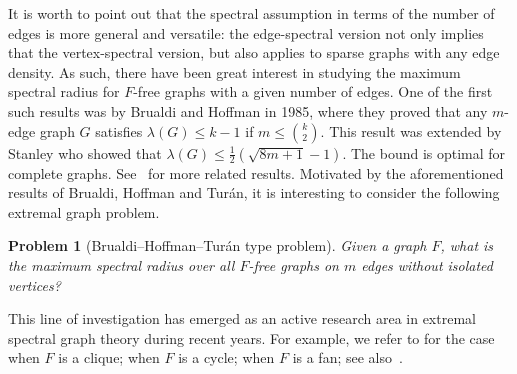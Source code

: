 \documentclass[11pt,a4paper]{article}
\newtheorem*{problem*}{Problem}
\theoremstyle{definition}
\theoremstyle{remark}
\newcommand{\spex}{\mathrm{spex}_{\mathrm{edge}}}
\begin{document}
It is worth to point out that the spectral assumption in terms of the number of edges is more general and versatile: the edge-spectral version not only implies that the vertex-spectral version, but also applies to sparse graphs with any edge density. As such, there have been great interest in studying the maximum spectral radius for $F$-free graphs with a given number of edges. One of the first such results was by Brualdi and Hoffman \cite{BH1985} in 1985, where they proved that any $m$-edge graph $G$ satisfies $\lambda (G)\le k-1$ if $m\le {k \choose 2}$. 
 This result was extended by Stanley \cite{Sta1987} who showed that 
 $\lambda (G)\le \frac{1}{2} 
 \left(\sqrt{8m+1} -1 \right).$
 The bound is optimal for complete graphs. 
See~\cite{HSF2001,Hong1988,Hong1998,Niki2002,ZC2005} for more related results. 
Motivated by the aforementioned results of Brualdi,  Hoffman and Tur\'{a}n, it is interesting to consider the following extremal graph problem. 

\begin{problem*}[Brualdi--Hoffman--Tur\'{a}n type problem] 
Given a graph $F$, 
   what is the maximum spectral radius over all $F$-free graphs on $m$ edges without isolated vertices?  
\end{problem*}

This line of investigation has emerged as an active research area in extremal spectral graph theory during recent years.   
For example, we refer to \cite{Niki2002,BN2007jctb,Niki2009jctb,Zhang2024,CSZ2024} for the case when $F$ is a clique; 
\cite{Niki2009,ZLS2021,ZS2022dm,LZS2024} when $F$ is a cycle; 
\cite{LLP2023,YLP2024,CY2024,LZZ2024} when $F$ is a fan; 
see also~\cite{Niki2021,NZ2021b,LLZ2024-book-qua,LLZ2025}. 
\end{document}
